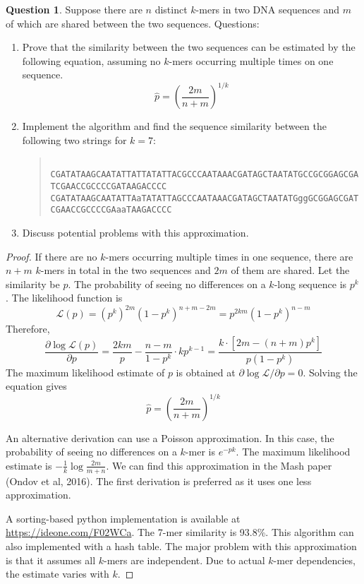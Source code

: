 \documentclass{article}[10pt]
\theoremstyle{definition}\newtheorem{question}{Question}
\begin{document}
\begin{question}
Suppose there are $n$ distinct $k$-mers in two DNA sequences and $m$ of which are
shared between the two sequences. Questions:
\begin{enumerate}
\item Prove that the similarity between the two sequences can be estimated by
the following equation, assuming no $k$-mers occurring multiple times on one
sequence.
$$
\hat{p}=\left(\frac{2m}{n+m}\right)^{1/k}
$$
\item Implement the algorithm and find the sequence similarity between the following two strings for $k=7$:
\begin{quote}
\footnotesize\tt
CGATATAAGCAATATTATTATATTACGCCCAATAAACGATAGCTAATATGCCGCGGAGCGATCGAACCGCCCCGATAAGACCCC\\
CGATATAAGCAATATTAaTATATTAGCCCAATAAACGATAGCTAATATGggGCGGAGCGATCGAACCGCCCCGAaaTAAGACCCC
\end{quote}
\item Discuss potential problems with this approximation.
\end{enumerate}
\end{question}

\begin{proof}
If there are no $k$-mers occurring multiple times in one sequence, there are
$n+m$ $k$-mers in total in the two sequences and $2m$ of them are shared.
Let the similarity be $p$. The probability of seeing no differences on a
$k$-long sequence is $p^k$. The likelihood function is
$$
\mathcal{L}(p)=\left(p^k\right)^{2m}\left(1-p^k\right)^{n+m-2m}=p^{2km}\left(1-p^k\right)^{n-m}
$$
Therefore,
$$
\frac{\partial\log\mathcal{L}(p)}{\partial p}=\frac{2km}{p}-\frac{n-m}{1-p^k}\cdot kp^{k-1}=\frac{k\cdot\left[2m-(n+m)p^k\right]}{p\left(1-p^k\right)}
$$
The maximum likelihood estimate of $p$ is obtained at
$\partial\log\mathcal{L}/\partial p=0$. Solving the equation gives
$$
\hat{p}=\left(\frac{2m}{n+m}\right)^{1/k}
$$

An alternative derivation can use a Poisson approximation. In this case, the
probability of seeing no differences on a $k$-mer is $e^{-pk}$. The maximum
likelihood estimate is $-\frac{1}{k}\log\frac{2m}{m+n}$. We can find this
approximation in the Mash paper (Ondov et al, 2016). The first derivation is
preferred as it uses one less approximation.

A sorting-based python implementation is available at
\href{https://ideone.com/F02WCa}{https://ideone.com/F02WCa}. The 7-mer
similarity is 93.8\%. This algorithm can also implemented with a hash table.
The major problem with this approximation is that it assumes all $k$-mers are
independent. Due to actual $k$-mer dependencies, the estimate varies with $k$.
\end{proof}
\end{document}

